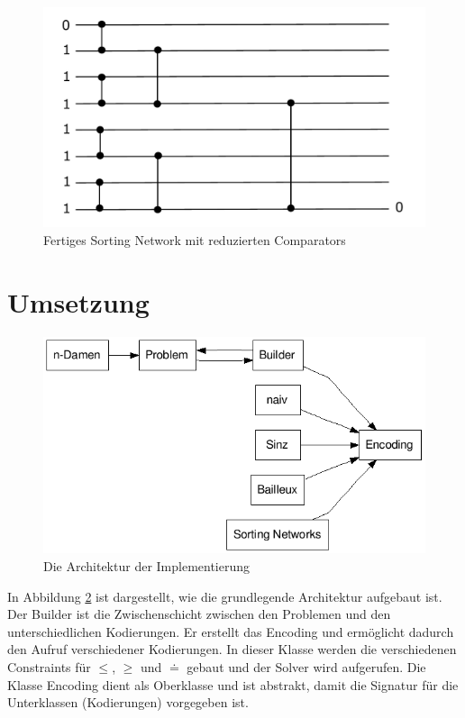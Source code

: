 \documentclass[a4,abstract=on]{scrartcl}
\newcommand*\stdsection{}
\let\stdsection\section
\renewcommand*\section{%
    \clearpage\ifodd\value{page}\else\mbox{}\clearpage\fi
    \stdsection}
\begin{document}
\begin{figure}[H]
\centering
\includegraphics[width=\textwidth]{ownSorting_end.pdf}
\caption{Fertiges Sorting Network mit reduzierten Comparators}
\label{fig:ownSortingEnd}
\end{figure}


\section{Umsetzung}

\begin{figure}[H]
\centering
\includegraphics[width=\textwidth]{architektur.png}
\caption{Die Architektur der Implementierung}
\label{fig:architektur}
\end{figure}

In Abbildung \ref{fig:architektur} ist dargestellt, wie die grundlegende Architektur aufgebaut ist. 
Der Builder ist die Zwischenschicht zwischen den Problemen und den unterschiedlichen Kodierungen. Er erstellt das Encoding und ermöglicht dadurch den Aufruf verschiedener Kodierungen. In dieser Klasse werden die verschiedenen Constraints für $\leq$, 	$\geq$ und $\doteq$ gebaut und der Solver wird aufgerufen. Die Klasse Encoding dient als Oberklasse und ist abstrakt, damit die Signatur für die Unterklassen (Kodierungen) vorgegeben ist. 
\end{document}
